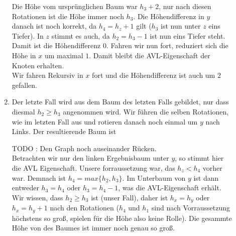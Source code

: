\documentclass[11pt,a4paper,ngerman]{article}
\begin{document}
\begin{description}
\begin{enumerate}[1. {Fall:}]
      Die Höhe vom ursprünglichen Baum war $h_3 + 2$, nur nach diesen Rotationen ist die Höhe immer noch $h_3$. Die Höhendifferenz in $y$ danach ist noch
      korrekt, da $h_4 = h_z + 1$ gilt ($h_3$ ist nun unter $z$ eins Tiefer).
      In $z$ stimmt es auch, da $h_2 = h_3 - 1$ ist nun eins Tiefer steht. Damit ist die Höhendifferenz $0$. Fahren wir nun fort, reduziert sich die Höhe
      in $x$ um maximal $1$. Damit bleibt die AVL-Eigenschaft der Knoten erhalten.\\

      Wir fahren Rekursiv in $x$ fort und die Höhendifferenz ist auch um $2$ gefallen.

      \item Der letzte Fall wird aus dem Baum des letzten Falls gebildet, nur dass diesmal $h_2 \geq h_3$ angenommen wird. Wir führen die selben Rotationen,
         wie im letzten Fall aus und rotieren danach noch einmal um $y$ nach Links. Der resultierende Baum ist

      \begin{center}
      \end{center}

      TODO : Den Graph noch auseinander Rücken.\\

      Betrachten wir nur den linken Ergebnisbaum unter $y$, so stimmt hier die AVL Eigenschaft. Unsere forraussetzung war, das $h_z < h_4$ vorher war. Demnach ist
      $h_4 = max\{ h_2, h_3 \}$. Im Unterbaum von $y$ ist dann entweder $h_3 = h_4$ oder $h_3 = h_4 - 1$, was die AVL-Eigenschaft erhält.\\
   
      Wir wissen, dass $h_2 \geq h_3$ ist (unser Fall), daher ist $h_x = h_y$ oder $h_x = h_y +1$ nach den Rotationen ($h_4$ und $h_1$ sind nach Vorraussetzung höchstens so groß, spielen
      für die Höhe also keine Rolle). Die gesammte Höhe von des Baumes ist immer noch genau so groß.


\end{enumerate}
\end{description}
\end{document}
